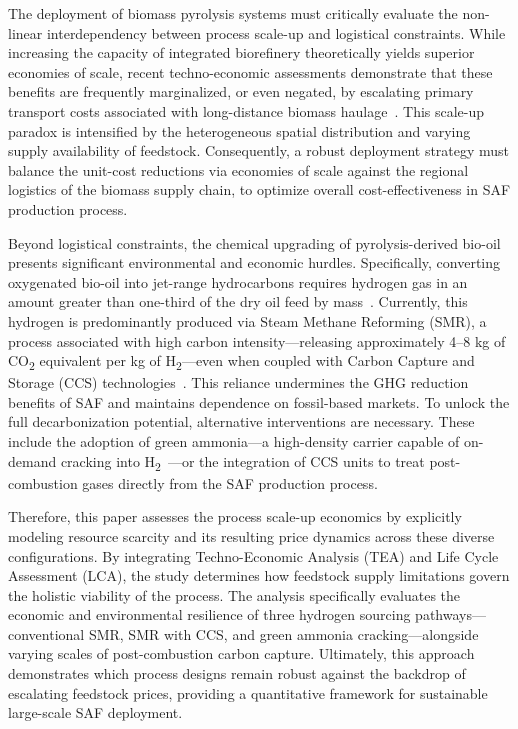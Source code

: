 The deployment of biomass pyrolysis systems must critically evaluate the non-linear interdependency between process scale-up and logistical constraints. While increasing the capacity of integrated biorefinery theoretically yields superior economies of scale, recent techno-economic assessments demonstrate that these benefits are frequently marginalized, or even negated, by escalating primary transport costs associated with long-distance biomass haulage~\cite{chireshe2025cost}. This scale-up paradox is intensified by the heterogeneous spatial distribution and varying supply availability of feedstock. Consequently, a robust deployment strategy must balance the unit-cost reductions via economies of scale against the regional logistics of the biomass supply chain, to optimize overall cost-effectiveness in SAF production process.

Beyond logistical constraints, the chemical upgrading of pyrolysis-derived bio-oil presents significant environmental and economic hurdles. Specifically, converting oxygenated bio-oil into jet-range hydrocarbons requires hydrogen gas in an amount greater than one-third of the dry oil feed by mass~\cite{jones2013process}. Currently, this hydrogen is predominantly produced via Steam Methane Reforming (SMR), a process associated with high carbon intensity—releasing approximately 4–8 kg of CO\textsubscript{2} equivalent per kg of H\textsubscript{2}—even when coupled with Carbon Capture and Storage (CCS) technologies~\cite{IEA2023HydrogenDefinitions}. This reliance undermines the GHG reduction benefits of SAF and maintains dependence on fossil-based markets. To unlock the full decarbonization potential, alternative interventions are necessary. These include the adoption of green ammonia—a high-density carrier capable of on-demand cracking into H\textsubscript{2}~\cite{valera2018ammonia, afif2016ammonia}—or the integration of CCS units to treat post-combustion gases directly from the SAF production process.

Therefore, this paper assesses the process scale-up economics by explicitly modeling resource scarcity and its resulting price dynamics across these diverse configurations. By integrating Techno-Economic Analysis (TEA) and Life Cycle Assessment (LCA), the study determines how feedstock supply limitations govern the holistic viability of the process. The analysis specifically evaluates the economic and environmental resilience of three hydrogen sourcing pathways—conventional SMR, SMR with CCS, and green ammonia cracking—alongside varying scales of post-combustion carbon capture. Ultimately, this approach demonstrates which process designs remain robust against the backdrop of escalating feedstock prices, providing a quantitative framework for sustainable large-scale SAF deployment.

